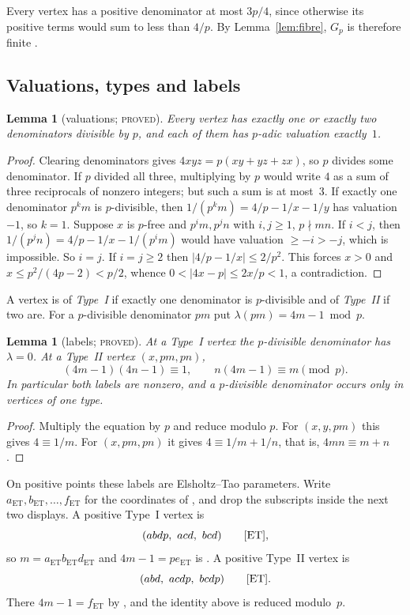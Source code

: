 \documentclass[11pt,reqno]{amsart}
\newtheorem{lemma}[theorem]{Lemma}
\theoremstyle{definition}
\newcommand{\status}[1]{\textsc{#1}}
\begin{document}
Every vertex has a positive denominator at most $3p/4$, since otherwise its
positive terms would sum to less than $4/p$.  By Lemma~\ref{lem:fibre}, $G_p$
is therefore finite \cite[Lemma~3.10]{BL}.

\subsection{Valuations, types and labels}

\begin{lemma}[valuations; \status{proved}]\label{lem:val}
Every vertex has exactly one or exactly two denominators divisible by $p$,
and each of them has $p$-adic valuation exactly~$1$.
\end{lemma}

\begin{proof}
Clearing denominators gives $4xyz=p(xy+yz+zx)$, so $p$ divides some
denominator.  If $p$ divided all three, multiplying by $p$ would write $4$ as
a sum of three reciprocals of nonzero integers; but such a sum is at most~$3$.  If
exactly one denominator $p^km$ is $p$-divisible, then
$1/(p^km)=4/p-1/x-1/y$ has valuation $-1$, so $k=1$.  Suppose $x$ is
$p$-free and $p^im,p^jn$ with $i,j\ge1$, $p\nmid mn$.  If $i<j$, then $1/(p^jn)=4/p-1/x-1/(p^im)$ would have valuation
$\ge-i>-j$, which is impossible.  So $i=j$.  If $i=j\ge2$ then
$|4/p-1/x|\le2/p^2$.  This forces $x>0$ and $x\le p^2/(4p-2)<p/2$, whence
$0<|4x-p|\le2x/p<1$, a contradiction.
\end{proof}

A vertex is of \emph{Type~I} if exactly one denominator is
$p$-divisible and of \emph{Type~II} if two are.  For a
$p$-divisible denominator $pm$ put $\lambda(pm)=4m-1\bmod p$.

\begin{lemma}[labels; \status{proved}]\label{lem:labels}
At a Type~I vertex the $p$-divisible denominator has $\lambda=0$.  At a Type~II
vertex $(x,pm,pn)$,
\[
 (4m-1)(4n-1)\equiv1,\qquad n(4m-1)\equiv m\pmod p .
\]
In particular both labels are nonzero, and a $p$-divisible denominator occurs
only in vertices of one type.
\end{lemma}

\begin{proof}
Multiply the equation by $p$ and reduce modulo $p$.  For $(x,y,pm)$ this
gives $4\equiv1/m$.  For $(x,pm,pn)$ it gives $4\equiv1/m+1/n$, that is,
$4mn\equiv m+n$.
\end{proof}

On positive points these labels are Elsholtz--Tao parameters.  Write
$a_{\mathrm{ET}},b_{\mathrm{ET}},\dots,f_{\mathrm{ET}}$ for the coordinates
of \cite[\S2]{ET}, and drop the subscripts inside the next two displays.
A positive Type~I vertex is
\[
 (abdp,\ acd,\ bcd)\qquad\text{\cite[Prop.~2.2]{ET}},
\]
so $m=a_{\mathrm{ET}}b_{\mathrm{ET}}d_{\mathrm{ET}}$ and
$4m-1=pe_{\mathrm{ET}}$ is \cite[(2.1)]{ET}.  A positive Type~II vertex is
\[
 (abd,\ acdp,\ bcdp)\qquad\text{\cite[(2.22), Prop.~2.6]{ET}}.
\]
There $4m-1=f_{\mathrm{ET}}$ by \cite[(2.18)]{ET},
and the identity above is \cite[(2.21)]{ET} reduced modulo~$p$.
\end{document}
